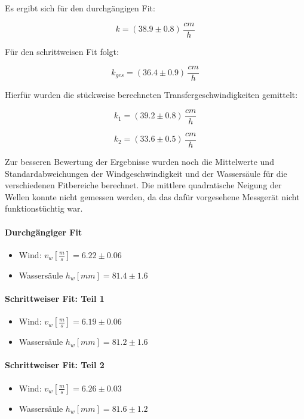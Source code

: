 \documentclass[12pt]{article}
\begin{document}
 Es ergibt sich für den durchgängigen Fit: 
 
\begin{equation}
	k = (38.9 \pm 0.8)\, \frac{cm}{h} 
\end{equation}

Für den schrittweisen Fit folgt:

\begin{equation}
k_{ges} = (36.4 \pm 0.9)\, \frac{cm}{h} 
\end{equation}

Hierfür wurden die stückweise berechneten Transfergeschwindigkeiten gemittelt:

\begin{equation}
k_1 = (39.2 \pm 0.8)\, \frac{cm}{h} 
\end{equation}

\begin{equation}
	k_2 = (33.6 \pm 0.5)\, \frac{cm}{h} 
\end{equation}

Zur besseren Bewertung der Ergebnisse wurden noch die Mittelwerte und Standardabweichungen der Windgeschwindigkeit und der Wassersäule für die verschiedenen Fitbereiche berechnet. Die mittlere quadratische Neigung der Wellen konnte nicht gemessen werden, da das dafür vorgesehene Messgerät nicht funktionstüchtig war.

\paragraph{Durchgängiger Fit}
\begin{itemize}
	\item Wind: $v_w [\frac{m}{s}] = 6.22 \pm 0.06 $
	\item Wassersäule $h_w[mm] = 81.4 \pm 1.6 $
\end{itemize}
\paragraph{Schrittweiser Fit: Teil 1}
\begin{itemize}
	\item Wind: $v_w [\frac{m}{s}] = 6.19 \pm 0.06 $
	\item Wassersäule $h_w[mm] = 81.2 \pm 1.6 $
\end{itemize}
\paragraph{Schrittweiser Fit: Teil 2}
\begin{itemize}
	\item Wind: $v_w [\frac{m}{s}] = 6.26 \pm 0.03 $
	\item Wassersäule $h_w[mm] = 81.6 \pm 1.2 $
\end{itemize}
\end{document}
